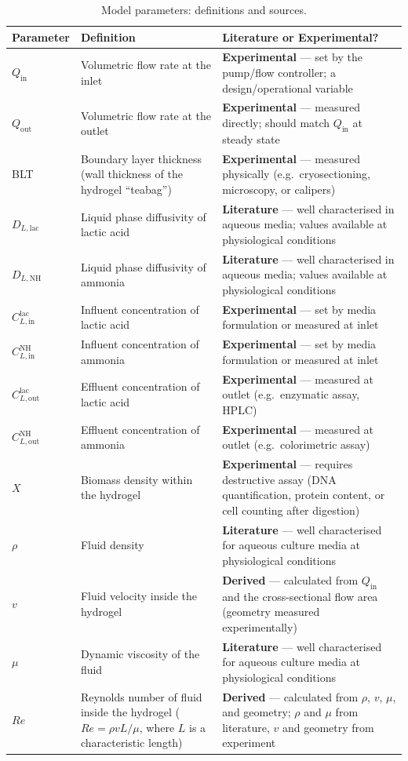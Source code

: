 \begin{table}[htb!]
\centering
\begin{tabular}{|l|p{6cm}|p{7cm}|}
\hline
\textbf{Parameter} & \textbf{Definition} & \textbf{Literature or Experimental?} \\
\hline
$Q_\text{in}$ & Volumetric flow rate at the inlet & \textbf{Experimental} --- set by the pump/flow controller; a design/operational variable \\
\hline
$Q_\text{out}$ & Volumetric flow rate at the outlet & \textbf{Experimental} --- measured directly; should match $Q_\text{in}$ at steady state \\
\hline
BLT & Boundary layer thickness (wall thickness of the hydrogel ``teabag'') & \textbf{Experimental} --- measured physically (e.g.\ cryosectioning, microscopy, or calipers) \\
\hline
$D_{L,\text{lac}}$ & Liquid phase diffusivity of lactic acid & \textbf{Literature} --- well characterised in aqueous media; values available at physiological conditions \\
\hline
$D_{L,\text{NH}}$ & Liquid phase diffusivity of ammonia & \textbf{Literature} --- well characterised in aqueous media; values available at physiological conditions \\
\hline
$C_{L,\text{in}}^\text{lac}$ & Influent concentration of lactic acid & \textbf{Experimental} --- set by media formulation or measured at inlet \\
\hline
$C_{L,\text{in}}^\text{NH}$ & Influent concentration of ammonia & \textbf{Experimental} --- set by media formulation or measured at inlet \\
\hline
$C_{L,\text{out}}^\text{lac}$ & Effluent concentration of lactic acid & \textbf{Experimental} --- measured at outlet (e.g.\ enzymatic assay, HPLC) \\
\hline
$C_{L,\text{out}}^\text{NH}$ & Effluent concentration of ammonia & \textbf{Experimental} --- measured at outlet (e.g.\ colorimetric assay) \\
\hline
$X$ & Biomass density within the hydrogel & \textbf{Experimental} --- requires destructive assay (DNA quantification, protein content, or cell counting after digestion) \\
\hline
$\rho$ & Fluid density & \textbf{Literature} --- well characterised for aqueous culture media at physiological conditions \\
\hline
$v$ & Fluid velocity inside the hydrogel & \textbf{Derived} --- calculated from $Q_\text{in}$ and the cross-sectional flow area (geometry measured experimentally) \\
\hline
$\mu$ & Dynamic viscosity of the fluid & \textbf{Literature} --- well characterised for aqueous culture media at physiological conditions \\
\hline
$Re$ & Reynolds number of fluid inside the hydrogel ($Re = \rho v L / \mu$, where $L$ is a characteristic length) & \textbf{Derived} --- calculated from $\rho$, $v$, $\mu$, and geometry; $\rho$ and $\mu$ from literature, $v$ and geometry from experiment \\
\hline
\end{tabular}
\caption{Model parameters: definitions and sources.}
\label{tab:parameters}
\end{table}
